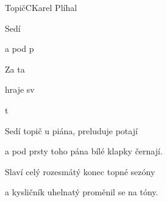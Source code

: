 \begin{song}{Topič}{C}{Karel Plíhal}

\begin{SBVerse}

Sedí 

a pod p

Za ta 

hraje sv

\end{SBVerse}

\begin{SBChorus}


t

\end{SBChorus}

\begin{SBVerse}

Sedí topič u piána, preluduje potají

a pod prsty toho pána bílé klapky černají.

Slaví celý rozesmátý konec topné sezóny

a kysličník uhelnatý proměnil se na tóny.

\end{SBVerse}

\end{song}

\pagebreak